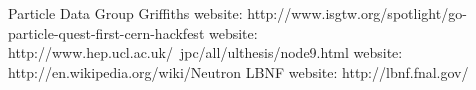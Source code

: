 \begin{thebibliography}{9}
    Particle Data Group
    Griffiths
    website: http://www.isgtw.org/spotlight/go-particle-quest-first-cern-hackfest
    website: http://www.hep.ucl.ac.uk/~jpc/all/ulthesis/node9.html
    website: http://en.wikipedia.org/wiki/Neutron
    LBNF website: http://lbnf.fnal.gov/
\end{thebibliography}
